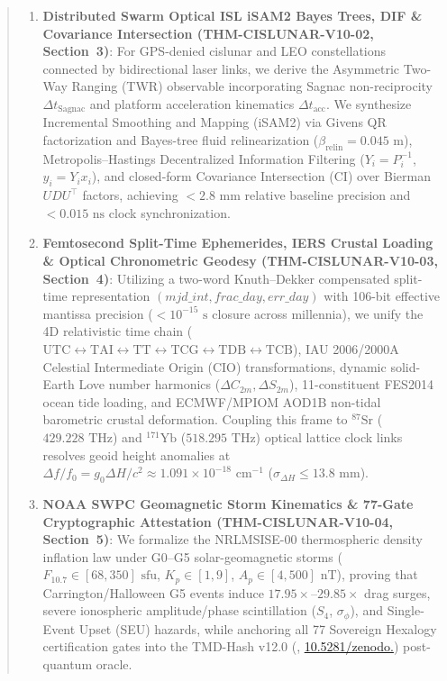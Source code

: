 \documentclass[11pt,a4paper,reqno]{article}
\def\bm#1{#1}%
\def\texttt#1{#1}%
\newcommand{\zenodo}[1]{\href{https://doi.org/10.5281/zenodo.#1}{\texttt{10.5281/\allowbreak zenodo.\allowbreak #1}}}
\theoremstyle{plain}
\theoremstyle{definition}
\theoremstyle{remark}
\numberwithin{equation}{section}
\begin{document}
\begin{abstract}
\begin{enumerate}[leftmargin=1.8em,itemsep=2pt,topsep=4pt]
  \item \textbf{Distributed Swarm Optical ISL iSAM2 Bayes Trees, DIF \& Covariance Intersection (\texttt{THM-CISLUNAR-V10-02}, Section~3)}: For GPS-denied cislunar and LEO constellations connected by bidirectional laser links, we derive the Asymmetric Two-Way Ranging (TWR) observable incorporating Sagnac non-reciprocity $\Delta t_{\text{Sagnac}}$ and platform acceleration kinematics $\Delta t_{\text{acc}}$. We synthesize Incremental Smoothing and Mapping (iSAM2) via Givens QR factorization and Bayes-tree fluid relinearization ($\beta_{\text{relin}} = 0.045\text{ m}$), Metropolis--Hastings Decentralized Information Filtering ($\bm{Y}_i = \bm{P}_i^{-1}$, $\bm{y}_i = \bm{Y}_i \bm{x}_i$), and closed-form Covariance Intersection (CI) over Bierman $\bm{U}\bm{D}\bm{U}^\top$ factors, achieving $< 2.8\text{ mm}$ relative baseline precision and $< 0.015\text{ ns}$ clock synchronization.
  \item \textbf{Femtosecond Split-Time Ephemerides, IERS Crustal Loading \& Optical Chronometric Geodesy (\texttt{THM-CISLUNAR-V10-03}, Section~4)}: Utilizing a two-word Knuth--Dekker compensated split-time representation $(\texttt{mjd\_int}, \texttt{frac\_day}, \texttt{err\_day})$ with 106-bit effective mantissa precision ($< 10^{-15}\text{ s}$ closure across millennia), we unify the 4D relativistic time chain ($\text{UTC} \leftrightarrow \text{TAI} \leftrightarrow \text{TT} \leftrightarrow \text{TCG} \leftrightarrow \text{TDB} \leftrightarrow \text{TCB}$), IAU 2006/2000A Celestial Intermediate Origin (CIO) transformations, dynamic solid-Earth Love number harmonics ($\Delta C_{2m}, \Delta S_{2m}$), 11-constituent FES2014 ocean tide loading, and ECMWF/MPIOM AOD1B non-tidal barometric crustal deformation. Coupling this frame to $^{87}\text{Sr}$ ($429.228\text{ THz}$) and $^{171}\text{Yb}$ ($518.295\text{ THz}$) optical lattice clock links resolves geoid height anomalies at $\Delta f / f_0 = g_0 \Delta H / c^2 \approx 1.091 \times 10^{-18}\text{ cm}^{-1}$ ($\sigma_{\Delta H} \le 13.8\text{ mm}$).
  \item \textbf{NOAA SWPC Geomagnetic Storm Kinematics \& 77-Gate Cryptographic Attestation (\texttt{THM-CISLUNAR-V10-04}, Section~5)}: We formalize the NRLMSISE-00 thermospheric density inflation law under G0--G5 solar-geomagnetic storms ($F_{10.7} \in [68, 350]\text{ sfu}$, $K_p \in [1, 9]$, $A_p \in [4, 500]\text{ nT}$), proving that Carrington/Halloween G5 events induce $17.95\times$--$29.85\times$ drag surges, severe ionospheric amplitude/phase scintillation ($S_4$, $\sigma_\phi$), and Single-Event Upset (SEU) hazards, while anchoring all 77 Sovereign Hexalogy certification gates into the TMD-Hash v12.0 (\cite{UnmaniTMD12}, \zenodo{23218553}) post-quantum oracle.
\end{enumerate}
\end{abstract}
\end{document}
